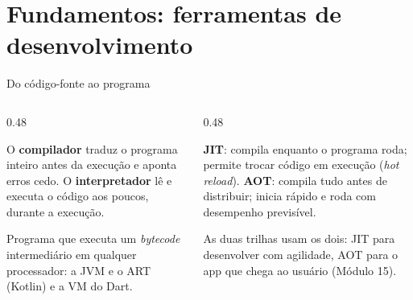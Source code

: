 \section{Fundamentos: ferramentas de desenvolvimento}

\begin{frame}{Do código-fonte ao programa}
  \centering
  \vspace{4pt}
  \begin{columns}[T]
    \begin{column}{0.48\textwidth}
      \begin{definicao}
        O \textbf{compilador} traduz o programa inteiro antes da execução e aponta erros cedo. O \textbf{interpretador} lê e executa o código aos poucos, durante a execução.
      \end{definicao}
      \begin{definicao}
        Programa que executa um \emph{bytecode} intermediário em qualquer processador: a JVM e o ART (Kotlin) e a VM do Dart.
      \end{definicao}
    \end{column}
    \begin{column}{0.48\textwidth}
      \begin{definicao}
        \textbf{JIT}: compila enquanto o programa roda; permite trocar código em execução (\emph{hot reload}).
        \textbf{AOT}: compila tudo antes de distribuir; inicia rápido e roda com desempenho previsível.
      \end{definicao}
      \begin{dica}
        As duas trilhas usam os dois: JIT para desenvolver com agilidade, AOT para o app que chega ao usuário (Módulo 15).
      \end{dica}
    \end{column}
  \end{columns}
\end{frame}

